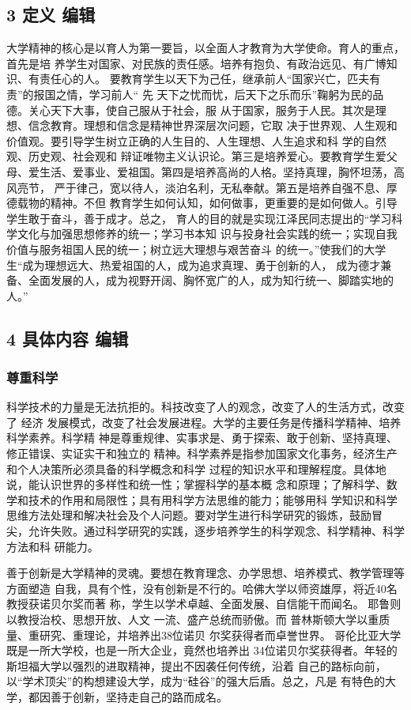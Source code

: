 \documentclass[11pt]{ctexart}
\begin{document}
{{{{\subsection{3 定义 编辑}
\label{sec:orgf68f81c}
大学精神的核心是以育人为第一要旨，以全面人才教育为大学使命。育人的重点，首先是培
养学生对国家、对民族的责任感。培养有抱负、有政治远见、有广博知识、有责任心的人。
要教育学生以天下为己任，继承前人“国家兴亡，匹夫有责”的报国之情，学习前人“ 先
天下之忧而忧，后天下之乐而乐”鞠躬为民的品德。关心天下大事，使自己服从于社会，服
从于国家，服务于人民。其次是理想、信念教育。理想和信念是精神世界深层次问题，它取
决于世界观、人生观和价值观。要引导学生树立正确的人生目的、人生理想、人生追求和科
学的自然观、历史观、社会观和 辩证唯物主义认识论。第三是培养爱心。要教育学生爱父
母、爱生活、爱事业、爱祖国。第四是培养高尚的人格。坚持真理，胸怀坦荡，高风亮节，
严于律己，宽以待人，淡泊名利，无私奉献。第五是培养自强不息、厚德载物的精神。不但
教育学生如何认知，如何做事，更重要的是如何做人。引导学生敢于奋斗，善于成才。总之，
育人的目的就是实现江泽民同志提出的“学习科学文化与加强思想修养的统一；学习书本知
识与投身社会实践的统一；实现自我价值与服务祖国人民的统一；树立远大理想与艰苦奋斗
的统一。”使我们的大学生“成为理想远大、热爱祖国的人，成为追求真理、勇于创新的人，
成为德才兼备、全面发展的人，成为视野开阔、胸怀宽广的人，成为知行统一、脚踏实地的
人。”


\subsection{4 具体内容 编辑}
\label{sec:org0e5a0de}
\subsubsection{尊重科学}
\label{sec:org17c0417}

科学技术的力量是无法抗拒的。科技改变了人的观念，改变了人的生活方式，改变了 经济
发展模式，改变了社会发展进程。大学的主要任务是传播科学精神、培养科学素养。科学精
神是尊重规律、实事求是、勇于探索、敢于创新、坚持真理、修正错误、实证实干和独立的
精神。科学素养是指参加国家文化事务，经济生产和个人决策所必须具备的科学概念和科学
过程的知识水平和理解程度。具体地说，能认识世界的多样性和统一性；掌握科学的基本概
念和原理；了解科学、数学和技术的作用和局限性；具有用科学方法思维的能力；能够用科
学知识和科学思维方法处理和解决社会及个人问题。要对学生进行科学研究的锻炼，鼓励冒
尖，允许失败。通过科学研究的实践，逐步培养学生的科学观念、科学精神、科学方法和科
研能力。


善于创新是大学精神的灵魂。要想在教育理念、办学思想、培养模式、教学管理等方面塑造
自我，具有个性，没有创新是不行的。哈佛大学以师资雄厚，将近40名教授获诺贝尔奖而著
称，学生以学术卓越、全面发展、自信能干而闻名。 耶鲁则以教授治校、思想开放、人文
一流、盛产总统而骄傲。而 普林斯顿大学以重质量、重研究、重理论，并培养出38位诺贝
尔奖获得者而卓誉世界。 哥伦比亚大学既是一所大学校，也是一所大企业，竟然也培养出
34位诺贝尔奖获得者。年轻的 斯坦福大学以强烈的进取精神，提出不因袭任何传统，沿着
自己的路标向前，以“学术顶尖”的构想建设大学，成为“硅谷”的强大后盾。总之，凡是
有特色的大学，都因善于创新，坚持走自己的路而成名。


}}}}
\end{document}
